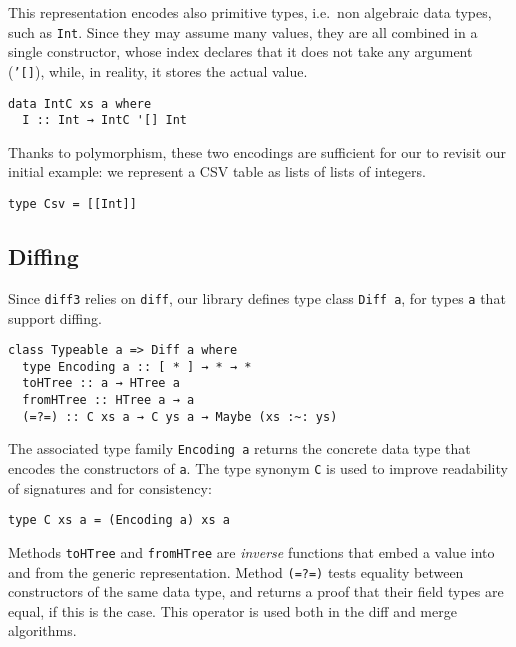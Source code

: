 \documentclass{sigplanconf}
\theoremstyle{plain}
\begin{document}
%
This representation encodes also primitive types, i.e.\ non algebraic
data types, such as \texttt{Int}.
%
Since they may assume many values, they are all combined in a single
constructor, whose index declares that it does not take any argument
(\texttt{'[]}), while, in reality, it stores the actual value.
\begin{verbatim}
data IntC xs a where
  I :: Int → IntC '[] Int
\end{verbatim}
Thanks to polymorphism, these two encodings are sufficient for our to
revisit our initial example: we represent a CSV table as lists of
lists of integers.
\begin{verbatim}
type Csv = [[Int]]
\end{verbatim} 

\subsection{Diffing}
Since \texttt{diff3} relies on \texttt{diff}, our library defines type
class \texttt{Diff a}, for types \texttt{a} that support diffing.

\begin{verbatim}
class Typeable a => Diff a where
  type Encoding a :: [ * ] → * → *
  toHTree :: a → HTree a
  fromHTree :: HTree a → a
  (=?=) :: C xs a → C ys a → Maybe (xs :~: ys)
\end{verbatim}
The associated type family \texttt{Encoding a} returns the concrete
data type that encodes the constructors of \texttt{a}.
%
The type synonym \texttt{C} is used to improve readability of signatures
and for consistency:
\begin{verbatim}
type C xs a = (Encoding a) xs a
\end{verbatim}
%
Methods \texttt{toHTree} and \texttt{fromHTree} are \emph{inverse}
functions that embed a value into and from the generic representation.
% 
%
%
%
%
Method \texttt{(=?=)} tests equality between constructors of the same
data type, and returns a proof that their field types are equal, if
this is the case. This operator is used both in the diff and merge
algorithms.
%
\end{document}
